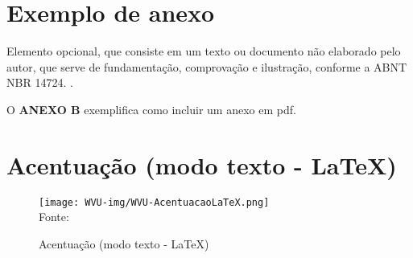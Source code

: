 \begin{anexosenv}

\partanexos

\chapter{Exemplo de anexo}
Elemento opcional, que consiste em um texto ou documento não elaborado pelo autor, que serve de fundamentação, comprovação e ilustração, conforme a ABNT NBR 14724. \cite{nbr14724}.

O \textbf{ANEXO B} exemplifica como incluir um anexo em pdf.

\chapter{Acentuação (modo texto - \LaTeX)}

\begin{figure}[H]
	\begin{center}
	\caption{\label{fig_anexob} Acentuação (modo texto - \LaTeX)}
	\texttt{[image: WVU-img/WVU-AcentuacaoLaTeX.png]} \\
	Fonte: 
	\end{center}	
\end{figure}

\end{anexosenv}
